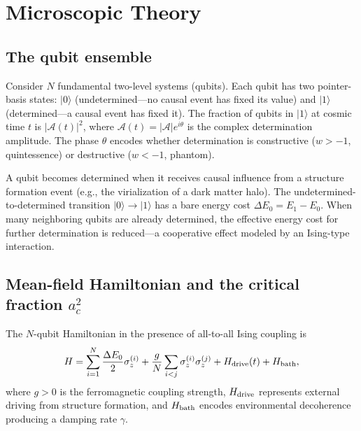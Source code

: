\documentclass[aps,prd,twocolumn,superscriptaddress]{revtex4-2}
\begin{document}

\section{Microscopic Theory}
\label{sec:theory}

\subsection{The qubit ensemble}

Consider $N$ fundamental two-level systems (qubits). Each qubit has two pointer-basis states: $|0\rangle$ (undetermined---no causal event has fixed its value) and $|1\rangle$ (determined---a causal event has fixed it). The fraction of qubits in $|1\rangle$ at cosmic time $t$ is $|\mathcal{A}(t)|^2$, where $\mathcal{A}(t) = |\mathcal{A}|e^{i\theta}$ is the complex determination amplitude. The phase $\theta$ encodes whether determination is constructive ($w > -1$, quintessence) or destructive ($w < -1$, phantom).

A qubit becomes determined when it receives causal influence from a structure formation event (e.g., the virialization of a dark matter halo). The undetermined-to-determined transition $|0\rangle \to |1\rangle$ has a bare energy cost $\Delta E_0 = E_1 - E_0$. When many neighboring qubits are already determined, the effective energy cost for further determination is reduced---a cooperative effect modeled by an Ising-type interaction.

\subsection{Mean-field Hamiltonian and the critical fraction $a_c^2$}

The $N$-qubit Hamiltonian in the presence of all-to-all Ising coupling is
\begin{equation}
H = \sum_{i=1}^{N} \frac{\Delta E_0}{2}\sigma_z^{(i)} + \frac{g}{N}\sum_{i<j}\sigma_z^{(i)}\sigma_z^{(j)} + H_{\rm drive}(t) + H_{\rm bath},
\label{eq:hamiltonian}
\end{equation}
where $g > 0$ is the ferromagnetic coupling strength, $H_{\rm drive}$ represents external driving from structure formation, and $H_{\rm bath}$ encodes environmental decoherence producing a damping rate $\gamma$.
\end{document}
